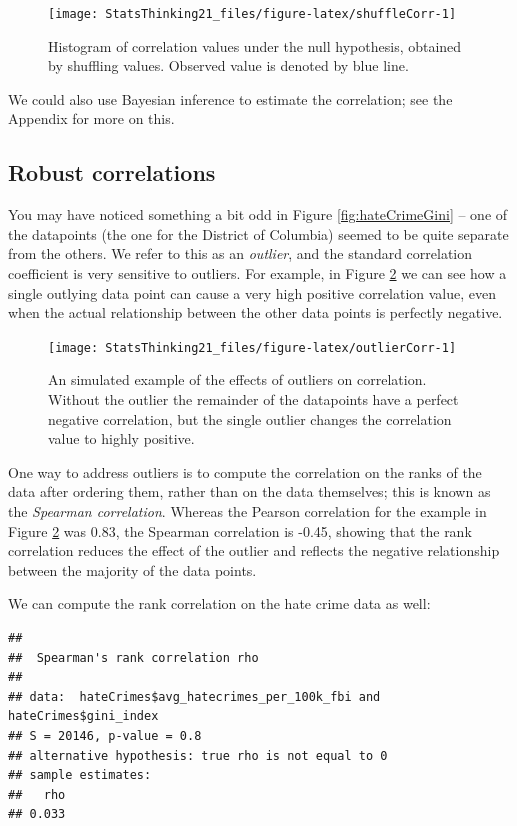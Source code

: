\documentclass[12pt,]{book}
\theoremstyle{definition}
\theoremstyle{definition}
\theoremstyle{definition}
\theoremstyle{remark}
\begin{document}
\begin{figure}
\texttt{[image: StatsThinking21\_files/figure-latex/shuffleCorr-1]} \caption{Histogram of correlation values under the null hypothesis, obtained by shuffling values. Observed value is denoted by blue line.}\label{fig:shuffleCorr}
\end{figure}

We could also use Bayesian inference to estimate the correlation; see the Appendix for more on this.

\hypertarget{robust-correlations}{%
\subsection{Robust correlations}\label{robust-correlations}}

You may have noticed something a bit odd in Figure \ref{fig:hateCrimeGini} -- one of the datapoints (the one for the District of Columbia) seemed to be quite separate from the others. We refer to this as an \emph{outlier}, and the standard correlation coefficient is very sensitive to outliers. For example, in Figure \ref{fig:outlierCorr} we can see how a single outlying data point can cause a very high positive correlation value, even when the actual relationship between the other data points is perfectly negative.

\begin{figure}
\texttt{[image: StatsThinking21\_files/figure-latex/outlierCorr-1]} \caption{An simulated example of the effects of outliers on correlation.  Without the outlier the remainder of the datapoints have a perfect negative correlation, but the single outlier changes the correlation value to highly positive.}\label{fig:outlierCorr}
\end{figure}

One way to address outliers is to compute the correlation on the ranks of the data after ordering them, rather than on the data themselves; this is known as the \emph{Spearman correlation}. Whereas the Pearson correlation for the example in Figure \ref{fig:outlierCorr} was 0.83, the Spearman correlation is -0.45, showing that the rank correlation reduces the effect of the outlier and reflects the negative relationship between the majority of the data points.

We can compute the rank correlation on the hate crime data as well:

\begin{verbatim}
## 
##  Spearman's rank correlation rho
## 
## data:  hateCrimes$avg_hatecrimes_per_100k_fbi and hateCrimes$gini_index
## S = 20146, p-value = 0.8
## alternative hypothesis: true rho is not equal to 0
## sample estimates:
##   rho 
## 0.033
\end{verbatim}
\end{document}
